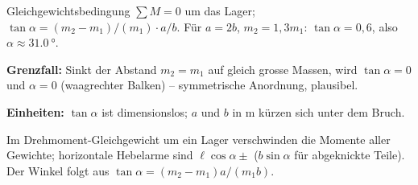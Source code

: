 \begin{ergebnis}
Gleichgewichtsbedingung $\sum M=0$ um das Lager;
$\tan\alpha=(m_2-m_1)/(m_1)\cdot a/b$. Für $a=2b$, $m_2=1,3m_1$:
$\tan\alpha=0{,}6$, also $\alpha\approx\qty{31.0}{\degree}$.
\end{ergebnis}

\begin{kontrolle}
\textbf{Grenzfall:} Sinkt der Abstand $m_2=m_1$ auf gleich grosse Massen,
wird $\tan\alpha=0$ und $\alpha=0$ (waagrechter Balken) -- symmetrische
Anordnung, plausibel. \checkmark

\textbf{Einheiten:} $\tan\alpha$ ist dimensionslos; $a$ und $b$ in m
kürzen sich unter dem Bruch. \checkmark
\end{kontrolle}

\begin{merksatz}
Im Drehmoment-Gleichgewicht um ein Lager verschwinden die Momente aller
Gewichte; horizontale Hebelarme sind $\ell\cos\alpha \pm$ ($b\sin\alpha$
für abgeknickte Teile). Der Winkel folgt aus
$\tan\alpha=(m_2-m_1)a/(m_1b)$.
\end{merksatz}
